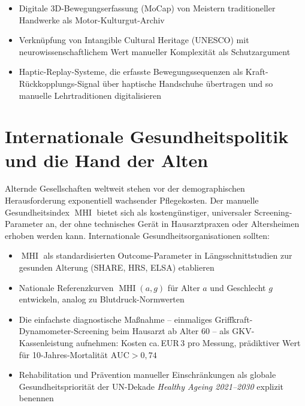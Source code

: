 ﻿\documentclass[12pt,a4paper]{report}
\theoremstyle{plain}
\theoremstyle{definition}
\theoremstyle{remark}
\DeclareMathOperator{\MHI}{MHI}
\begin{document}
\begin{itemize}
\item Digitale 3D-Bewegungserfassung (MoCap) von Meistern traditioneller
  Handwerke als Motor-Kulturgut-Archiv
\item Verknüpfung von Intangible Cultural Heritage (UNESCO) mit
  neurowissenschaftlichem Wert manueller Komplexität als Schutzargument
\item Haptic-Replay-Systeme, die erfasste Bewegungssequenzen als
  Kraft-Rückkopplungs-Signal über haptische Handschuhe übertragen
  und so manuelle Lehrtraditionen digitalisieren
\end{itemize}

\section{Internationale Gesundheitspolitik und die Hand der Alten}

Alternde Gesellschaften weltweit stehen vor der demographischen
Herausforderung exponentiell wachsender Pflegekosten. Der manuelle
Gesundheitsindex $\MHI$ bietet sich als
kostengünstiger, universaler Screening-Parameter an, der ohne technisches
Gerät in Hausarztpraxen oder Altersheimen erhoben werden kann.
Internationale Gesundheitsorganisationen sollten:

\begin{itemize}
\item $\MHI$ als standardisierten Outcome-Parameter in Längsschnittstudien
  zur gesunden Alterung (SHARE, HRS, ELSA) etablieren
\item Nationale Referenzkurven $\MHI(a, g)$ für Alter $a$ und Geschlecht
  $g$ entwickeln, analog zu Blutdruck-Normwerten
\item Die einfachste diagnostische Maßnahme -- einmaliges Griffkraft-
  Dynamometer-Screening beim Hausarzt ab Alter 60 -- als GKV-Kassenleistung
  aufnehmen: Kosten ca.\,EUR\,3 pro Messung, prädiktiver Wert für
  10-Jahres-Mortalität $\text{AUC} > 0{,}74$
\item Rehabilitation und Prävention manueller Einschränkungen als globale
  Gesundheitspriorität der UN-Dekade \emph{Healthy Ageing 2021--2030}
  explizit benennen
\end{itemize}
\end{document}
